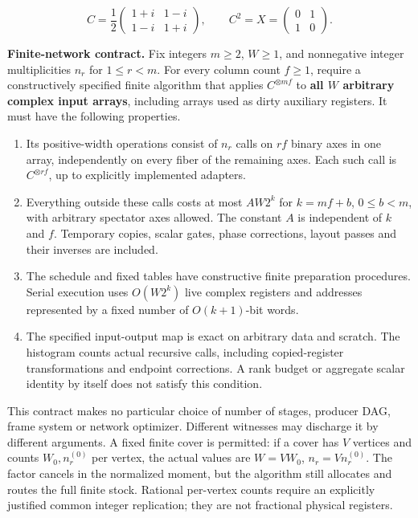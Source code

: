 \documentclass[
  11pt,
]{article}
\providecommand{\tightlist}{%
  \setlength{\itemsep}{0pt}\setlength{\parskip}{0pt}}
\begin{document}
\[C=\frac12\begin{pmatrix}1+i&1-i\\1-i&1+i\end{pmatrix},
\qquad C^2=X=\begin{pmatrix}0&1\\1&0\end{pmatrix}.\]

\textbf{Finite-network contract.} Fix integers \(m\ge2\), \(W\ge1\), and
nonnegative integer multiplicities \(n_r\) for \(1\le r<m\). For every
column count \(f\ge1\), require a constructively specified finite
algorithm that applies \(C^{\otimes mf}\) to \textbf{all \(W\) arbitrary
complex input arrays}, including arrays used as dirty auxiliary
registers. It must have the following properties.

\begin{enumerate}
\def\labelenumi{\arabic{enumi}.}
\tightlist
\item
  Its positive-width operations consist of \(n_r\) calls on \(rf\)
  binary axes in one array, independently on every fiber of the
  remaining axes. Each such call is \(C^{\otimes rf}\), up to explicitly
  implemented adapters.
\item
  Everything outside these calls costs at most \(A W2^k\) for
  \(k=mf+b\), \(0\le b<m\), with arbitrary spectator axes allowed. The
  constant \(A\) is independent of \(k\) and \(f\). Temporary copies,
  scalar gates, phase corrections, layout passes and their inverses are
  included.
\item
  The schedule and fixed tables have constructive finite preparation
  procedures. Serial execution uses \(O(W2^k)\) live complex registers
  and addresses represented by a fixed number of \(O(k+1)\)-bit words.
\item
  The specified input-output map is exact on arbitrary data and scratch.
  The histogram counts actual recursive calls, including copied-register
  transformations and endpoint corrections. A rank budget or aggregate
  scalar identity by itself does not satisfy this condition.
\end{enumerate}

This contract makes no particular choice of number of stages, producer
DAG, frame system or network optimizer. Different witnesses may
discharge it by different arguments. A fixed finite cover is permitted:
if a cover has \(V\) vertices and counts \(W_0,n_r^{(0)}\) per vertex,
the actual values are \(W=VW_0\), \(n_r=Vn_r^{(0)}\). The factor cancels
in the normalized moment, but the algorithm still allocates and routes
the full finite stock. Rational per-vertex counts require an explicitly
justified common integer replication; they are not fractional physical
registers.
\end{document}
